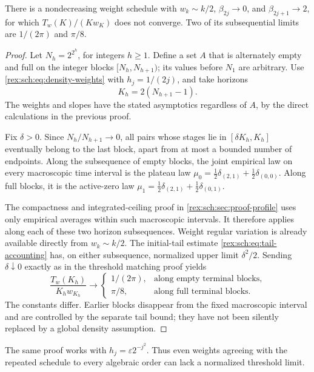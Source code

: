 \begin{theorem}
\label{rex:sch:thm:no-limit}
There is a nondecreasing weight schedule with $w_k\sim k/2$,
$\beta_{2j}\to0$, and $\beta_{2j+1}\to2$, for which
$T_w(K)/(K w_K)$ does not converge. Two of its subsequential limits
are $1/(2\pi)$ and $\pi/8$.
\end{theorem}

\begin{proof}
Let $N_h=2^{2^h}$, for integers $h\geq1$. Define a set $A$ that is
alternately empty and full on the integer blocks
$[N_h,N_{h+1})$; its values before $N_1$ are arbitrary. Use
\eqref{rex:sch:eq:density-weights} with $h_j=1/(2j)$, and take horizons
\[
 K_h=2(N_{h+1}-1).
\]
The weights and slopes have the stated asymptotics regardless of
$A$, by the direct calculations in the previous proof.

Fix $\delta>0$. Since $N_h/N_{h+1}\to0$, all pairs whose stages
lie in $[\delta K_h,K_h]$ eventually belong to the last block,
apart from at most a bounded number of endpoints. Along the
subsequence of empty blocks, the joint empirical law on every
macroscopic time interval is the plateau law
$\mu_0=\frac12\delta_{(2,1)}+\frac12\delta_{(0,0)}$.
Along full blocks, it is the active-zero law
$\mu_1=\frac12\delta_{(2,1)}+\frac12\delta_{(0,1)}$.

The compactness and integrated-ceiling proof in
\cref{rex:sch:sec:proof-profile} uses only empirical averages within such
macroscopic intervals. It therefore applies along each of these
two horizon subsequences. Weight regular variation is already
available directly from $w_k\sim k/2$. The initial-tail estimate
\eqref{rex:sch:eq:tail-accounting} has, on either subsequence, normalized
upper limit $\delta^2/2$. Sending $\delta\downarrow0$ exactly as
in the threshold matching proof yields
\[
 \frac{T_w(K_h)}{K_hw_{K_h}}\longrightarrow
 \begin{cases}
 1/(2\pi),&\text{along empty terminal blocks},\\
 \pi/8,&\text{along full terminal blocks}.
 \end{cases}
\]
The constants differ. Earlier blocks disappear from the fixed
macroscopic interval and are controlled by the separate tail bound;
they have not been silently replaced by a global density assumption.
\end{proof}

The same proof works with $h_j=\varepsilon2^{-j^2}$. Thus even
weights agreeing with the repeated schedule to every algebraic
order can lack a normalized threshold limit.

